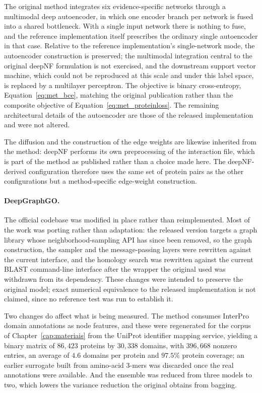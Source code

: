 \documentclass[Ingles]{ic-tese-v3}
\begin{document}
\begin{appendices}{}
The original method integrates six evidence-specific networks through a multimodal deep autoencoder,
in which one encoder branch per network is fused into a shared bottleneck. With a single input
network there is nothing to fuse, and the reference implementation itself prescribes the ordinary
single autoencoder in that case. Relative to the reference implementation's single-network mode, the
autoencoder construction is preserved; the multimodal integration central to the original deepNF
formulation is not exercised, and the downstream support vector machine, which could not be
reproduced at this scale and under this label space, is replaced by a multilayer perceptron. The
objective is binary cross-entropy, Equation~\eqref{eq:met_bce}, matching the original publication
rather than the composite objective of Equation~\eqref{eq:met_proteinloss}. The remaining
architectural details of the autoencoder are those of the released implementation and were not
altered.

The diffusion and the construction of the edge weights are likewise inherited from the method:
deepNF performs its own preprocessing of the interaction file, which is part of the method as
published rather than a choice made here. The deepNF-derived configuration therefore uses the same
set of protein pairs as the other configurations but a method-specific edge-weight construction.

\paragraph{DeepGraphGO.} The official codebase was modified in place rather than reimplemented. Most
of the work was porting rather than adaptation: the released version targets a graph library whose
neighborhood-sampling API has since been removed, so the graph construction, the sampler and the
message-passing layers were rewritten against the current interface, and the homology search was
rewritten against the current BLAST command-line interface after the wrapper the original used was
withdrawn from its dependency. These changes were intended to preserve the original model; exact
numerical equivalence to the released implementation is not claimed, since no reference test was run
to establish it.

Two changes do affect what is being measured. The method consumes InterPro domain annotations as node
features, and these were regenerated for the corpus of Chapter~\ref{cap:materiais} from the UniProt
identifier mapping service, yielding a binary matrix of $86{,}423$ proteins by $30{,}338$ domains,
with $396{,}668$ nonzero entries, an average of $4.6$ domains per protein and $97.5\%$ protein
coverage; an earlier surrogate built from amino-acid $3$-mers was discarded once the real
annotations were available. And the ensemble was reduced from three models to two, which lowers the
variance reduction the original obtains from bagging.


\end{appendices}
\end{document}
